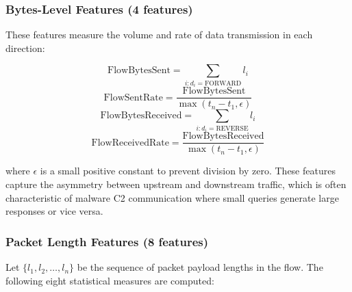 \documentclass[../Main.tex]{subfiles}
\begin{document}
\subsubsection{Bytes-Level Features (4 features)}

These features measure the volume and rate of data transmission in each direction:

\begin{equation}
\text{FlowBytesSent} = \sum_{i: d_i = \text{FORWARD}} l_i
\end{equation}
\begin{equation}
\text{FlowSentRate} = \frac{\text{FlowBytesSent}}{\max(t_n - t_1, \epsilon)}
\end{equation}
\begin{equation}
\text{FlowBytesReceived} = \sum_{i: d_i = \text{REVERSE}} l_i
\end{equation}
\begin{equation}
\text{FlowReceivedRate} = \frac{\text{FlowBytesReceived}}{\max(t_n - t_1, \epsilon)}
\end{equation}

where $\epsilon$ is a small positive constant to prevent division by zero. These features capture the asymmetry between upstream and downstream traffic, which is often characteristic of malware C2 communication where small queries generate large responses or vice versa.

\subsubsection{Packet Length Features (8 features)}

Let $\{l_1, l_2, \ldots, l_n\}$ be the sequence of packet payload lengths in the flow. The following eight statistical measures are computed:
\end{document}
